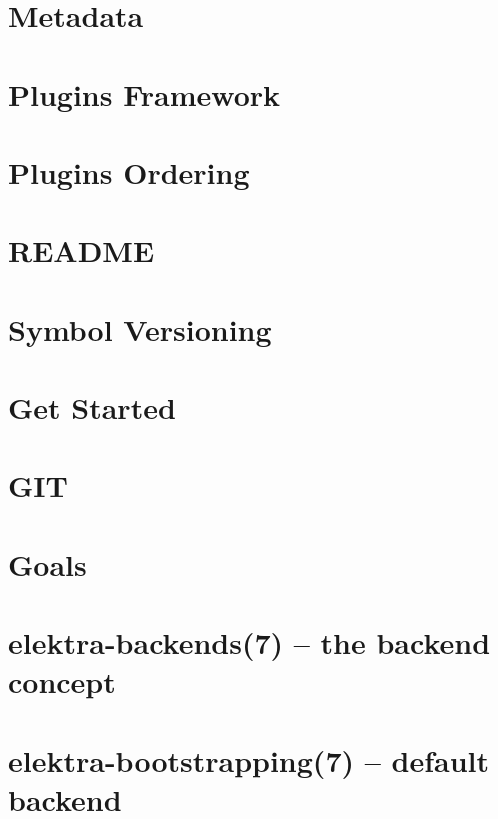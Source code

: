 \let\mypdfximage\pdfximage\def\pdfximage{\immediate\mypdfximage}\documentclass[twoside]{book}
\newcommand{\+}{\discretionary{\mbox{\scriptsize$\hookleftarrow$}}{}{}}
\begin{document}
\chapter{Metadata}
\label{doc_dev_metadata_md}

\chapter{Plugins Framework}
\label{doc_dev_plugins-framework_md}

\chapter{Plugins Ordering}
\label{doc_dev_plugins-ordering_md}

\chapter{README}
\label{md_doc_dev_README}

\chapter{Symbol Versioning}
\label{doc_dev_symbol-versioning_md}

\chapter{Get Started}
\label{doc_GETSTARTED_md}

\chapter{GIT}
\label{doc_GIT_md}

\chapter{Goals}
\label{doc_GOALS_md}

\chapter{elektra-\/backends(7) -- the backend concept}
\label{doc_help_elektra-backends_md}

\chapter{elektra-\/bootstrapping(7) -- default backend}
\label{doc_help_elektra-bootstrapping_md}

\end{document}
